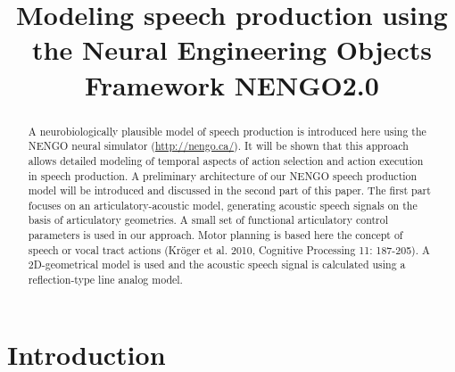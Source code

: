 \documentclass[conference]{IEEEtran}
\begin{document}
\title{Modeling speech production using the
  Neural Engineering Objects Framework NENGO2.0}

\author{
\and
{}
}

\maketitle

\begin{abstract}
  A neurobiologically plausible model of speech production is
  introduced here using the NENGO neural simulator
  (\url{http://nengo.ca/}). It will be shown that this approach allows
  detailed modeling of temporal aspects of action selection and action
  execution in speech production. A preliminary architecture of our
  NENGO speech production model will be introduced and discussed in
  the second part of this paper. The first part focuses on an
  articulatory-acoustic model, generating acoustic speech signals on
  the basis of articulatory geome­tries. A small set of functional
  articulatory control parameters is used in our approach. Motor
  planning is based here the concept of speech or vocal tract actions
  (Kr\"{o}ger et al. 2010, Cognitive Processing 11: 187-205). A
  2D-geometrical model is used and the acoustic speech signal is
  calculated using a reflection-type line analog model.
\end{abstract}


\IEEEpeerreviewmaketitle

\section{Introduction}
\end{document}
